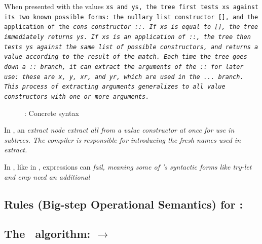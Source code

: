 \documentclass[manuscript,screen,review, 12pt, nonacm]{acmart}
\begin{document}
    When presented with the values \tt{xs} and \tt{ys}, the tree first tests
    \tt{xs} against its two known possible forms: the nullary list constructor
    \tt{[]}, and the application of the \it{cons} constructor \tt{::}. If
    \tt{xs} is equal to \tt{[]}, the tree immediately returns \tt{ys}. If
    \tt{xs} is an application of \tt{::}, the tree then tests \tt{ys} against
    the same list of possible constructors, and returns a value according to the
    result of the match. Each time the tree goes down a \tt{::} branch, it can
    extract the arguments of the \tt{::} for later use: these are \tt{x},
    \tt{y}, \tt{xr}, and \tt{yr}, which are used in the \tt{...} branch. This
    process of extracting arguments generalizes to all value constructors with
    one or more arguments. 

    \begin{figure}
      \begin{center}
      \dcsyntax
      \end{center}
      \caption{\D: Concrete syntax}
      \label{fig:dsyntax}
      \end{figure}



    In \D, an \it{extract} node extract all from a value constructor at once for
    use in subtrees. The compiler is responsible for introducing the fresh names
    used in \it{extract}. 

    In \D, like in \VMinus, expressions can \it{fail}, meaning some of \D's 
    syntactic forms like \it{try-let} and \it{cmp} need an additional 


    \subsection{Rules (Big-step Operational Semantics) for \D:}
    \label{dsemantics}
    
    \subsection{The \DTran\ algorithm: \VMinus $\rightarrow$ \D}
\end{document}
